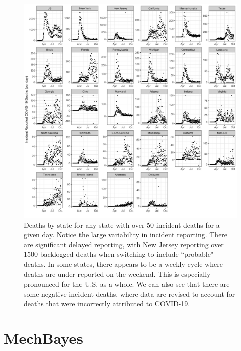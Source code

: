\documentclass[11pt]{amsart}
\begin{document}
 \begin{figure}
     \centering
     \includegraphics[scale=.17]{data_plot.png}
     \caption{Deaths by state for any state with over 50 incident deaths for a given day. Notice the large variability in incident reporting. There are significant delayed reporting, with New Jersey reporting over 1500 backlogged deaths when switching to include ``probable" deaths. In some states, there appears to be a weekly cycle where deaths are under-reported on the weekend. This is especially pronounced for the U.S. as a whole. We can also see that there are some negative incident deaths, where data are revised to account for deaths that were incorrectly attributed to COVID-19. }
     \label{fig:data}
 \end{figure}
 
 \section{MechBayes}
\end{document}
